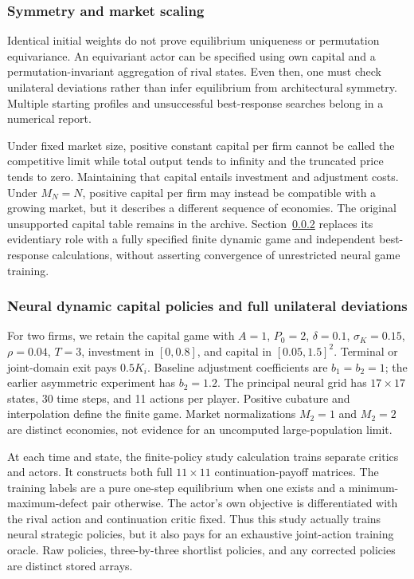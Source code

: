 \subsubsection{Symmetry and market scaling}
Identical initial weights do not prove equilibrium uniqueness or permutation equivariance. An equivariant actor can be specified using own capital and a permutation-invariant aggregation of rival states. Even then, one must check unilateral deviations rather than infer equilibrium from architectural symmetry. Multiple starting profiles and unsuccessful best-response searches belong in a numerical report.

Under fixed market size, positive constant capital per firm cannot be called the competitive limit while total output tends to infinity and the truncated price tends to zero. Maintaining that capital entails investment and adjustment costs. Under $M_N=N$, positive capital per firm may instead be compatible with a growing market, but it describes a different sequence of economies. The original unsupported capital table remains in the archive. Section~\ref{sec:dynamic-computation} replaces its evidentiary role with a fully specified finite dynamic game and independent best-response calculations, without asserting convergence of unrestricted neural game training.


\subsubsection{Neural dynamic capital policies and full unilateral deviations}\label{sec:dynamic-computation}
For two firms, we retain the capital game with $A=1$, $P_0=2$, $\delta=0.1$, $\sigma_K=0.15$, $\rho=0.04$, $T=3$, investment in $[0,0.8]$, and capital in $[0.05,1.5]^2$. Terminal or joint-domain exit pays $0.5K_i$. Baseline adjustment coefficients are $b_1=b_2=1$; the earlier asymmetric experiment has $b_2=1.2$. The principal neural grid has $17\times17$ states, 30 time steps, and 11 actions per player. Positive cubature and interpolation define the finite game. Market normalizations $M_2=1$ and $M_2=2$ are distinct economies, not evidence for an uncomputed large-population limit.

At each time and state, the finite-policy study calculation trains separate critics and actors. It constructs both full $11\times11$ continuation-payoff matrices. The training labels are a pure one-step equilibrium when one exists and a minimum-maximum-defect pair otherwise. The actor's own objective is differentiated with the rival action and continuation critic fixed. Thus this study actually trains neural strategic policies, but it also pays for an exhaustive joint-action training oracle. Raw policies, three-by-three shortlist policies, and any corrected policies are distinct stored arrays.

